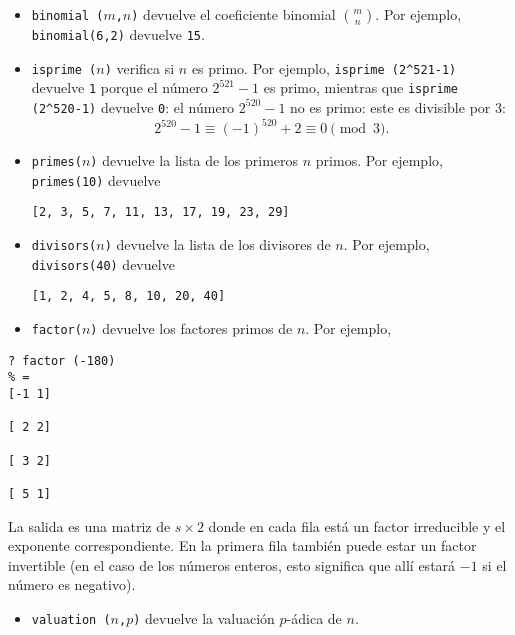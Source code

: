 \begin{itemize}
\item \texttt{binomial\,($m$,$n$)} devuelve el coeficiente binomial
  ${m\choose n}$. Por ejemplo, \texttt{binomial(6,2)} devuelve \texttt{15}.

\item \texttt{isprime\,($n$)} verifica si $n$ es primo. Por ejemplo,
  \texttt{isprime\,(2\^{}521-1)} devuelve \texttt{1} porque el número
  $2^{521}-1$ es primo, mientras que \texttt{isprime\,(2\^{}{520}-1)} devuelve
  \texttt{0}: el número $2^{520}-1$ no es primo: este es divisible por $3$:
  $$2^{520}-1 \equiv (-1)^{520} + 2 \equiv 0 \pmod{3}.$$

\item \texttt{primes($n$)} devuelve la lista de los primeros $n$ primos. Por
  ejemplo, \texttt{primes(10)} devuelve
  \begin{center}
    \texttt{[2, 3, 5, 7, 11, 13, 17, 19, 23, 29]}
  \end{center}

\item \texttt{divisors($n$)} devuelve la lista de los divisores de $n$. Por
  ejemplo, \texttt{divisors(40)} devuelve
  \begin{center}
    \texttt{[1,\,2,\,4,\,5,\,8,\,10,\,20,\,40]}
  \end{center}

\item \texttt{factor($n$)} devuelve los factores primos de $n$. Por ejemplo,
\end{itemize}

\begin{framed}\footnotesize
\begin{verbatim}
? factor (-180)
% = 
[-1 1]

[ 2 2]

[ 3 2]

[ 5 1]
\end{verbatim}
\end{framed}

La salida es una matriz de $s\times 2$ donde en cada fila está un factor
irreducible y el exponente correspondiente. En la primera fila también puede
estar un factor invertible (en el caso de los números enteros, esto significa
que allí estará $-1$ si el número es negativo).

\begin{itemize}
\item \texttt{valuation\,($n$,$p$)} devuelve la valuación $p$-ádica de $n$.
\end{itemize}

